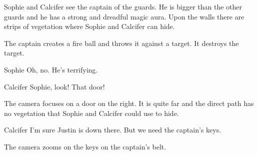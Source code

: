 \begin{screenplay}

Sophie and Calcifer see the captain of the guards. He is bigger than the other guards and he has a strong and dreadful magic aura. Upon the walls there are strips of vegetation where Sophie and Calcifer can hide.

The captain creates a fire ball and throws it against a target. It destroys the target.

\begin{dialogue}{Sophie}
Oh, no. He's terrifying.
\end{dialogue}

\begin{dialogue}{Calcifer}
Sophie, look! That door!
\end{dialogue}

The camera focuses on a door on the right. It is quite far and the direct path has no vegetation that Sophie and Calcifer could use to hide.

\begin{dialogue}[continuing]{Calcifer}
I'm sure Justin is down there. But we need the captain's keys.
\end{dialogue}

The camera zooms on the keys on the captain's belt.

\end{screenplay}
\vspace{1em}


